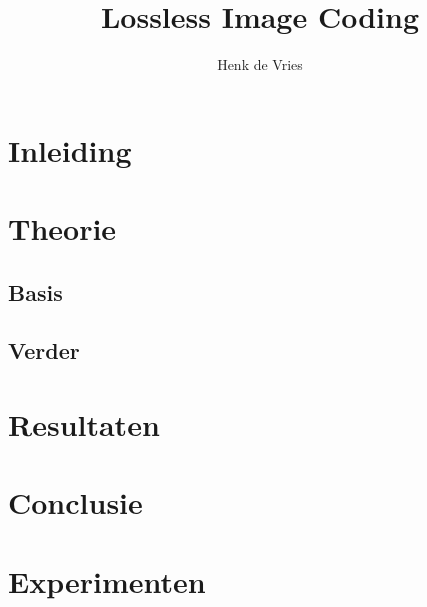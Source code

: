 \documentclass{uvamath}
\title{Lossless Image Coding}
\author[henk@science.uva.nl, 6127901]{Henk de Vries}
\begin{document}
\maketitle

\begin{abstract}
\lipsum[2-3]
\end{abstract}

\tableofcontents

\chapter{Inleiding}
\lipsum

\chapter{Theorie}
\lipsum[2]
\section{Basis}
\lipsum[5-6]
\section{Verder}
\lipsum[7]

\chapter{Resultaten}
\lipsum[2]

\chapter{Conclusie}
\lipsum[1]

\appendix

\chapter{Experimenten}
\lipsum[2]
\end{document}
